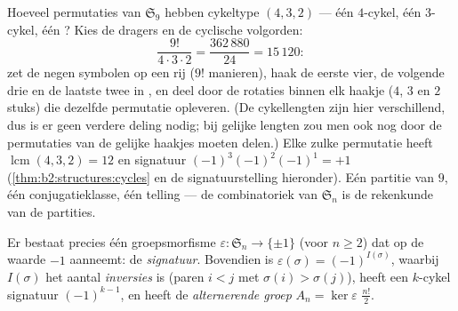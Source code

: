 \begin{example}\label{ex:b2:structures:cycletype}
Hoeveel permutaties van $\mathfrak{S}_9$ hebben cykeltype $(4, 3,
2)$ --- één $4$-cykel, één $3$-cykel, één ? Kies de
dragers en de cyclische volgorden:
\[
\frac{9!}{4\cdot 3\cdot 2}
= \frac{362\,880}{24} = 15\,120 :
\]
zet de negen symbolen op een rij ($9!$ manieren), haak de eerste
vier, de volgende drie en de laatste twee in , en deel door
de rotaties binnen elk haakje ($4$, $3$ en $2$ stuks) die dezelfde
permutatie opleveren. (De cykellengten zijn hier verschillend,
dus is er geen verdere deling nodig; bij gelijke lengten zou men
ook nog door de permutaties van de gelijke haakjes moeten delen.)
Elke zulke permutatie heeft  $\operatorname{lcm}(4,3,2) = 12$
en signatuur $(-1)^3(-1)^2(-1)^1 = +1$
(\cref{thm:b2:structures:cycles} en de signatuurstelling
hieronder). Eén partitie van $9$, één conjugatieklasse, één
telling --- de combinatoriek van $\mathfrak{S}_n$ is de
rekenkunde van de partities.
\end{example}

\begin{theorem}[Signatuur]\label{thm:b2:structures:signature}
Er bestaat precies één groepsmorfisme $\varepsilon \colon
\mathfrak{S}_n \to \{\pm 1\}$ (voor $n \geq 2$) dat op
 de waarde $-1$ aanneemt: de
\emph{signatuur}. Bovendien is
$\varepsilon(\sigma) = (-1)^{I(\sigma)}$, waarbij $I(\sigma)$ het
aantal \emph{inversies} is (paren $i < j$ met $\sigma(i) >
\sigma(j)$), heeft een $k$-cykel signatuur $(-1)^{k-1}$, en heeft
de \emph{alternerende groep} $A_n = \ker\varepsilon$ 
$\frac{n!}{2}$.
\end{theorem}


